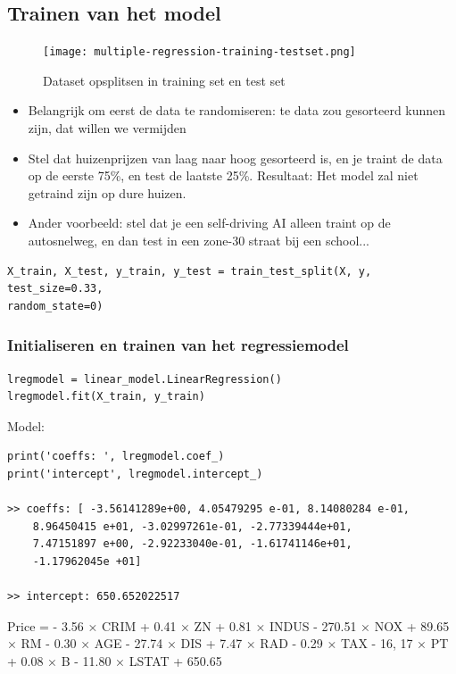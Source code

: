 \documentclass{article}
\begin{document}
\subsection{Trainen van het model}

\begin{figure}[H]
    \centering
    \texttt{[image: multiple-regression-training-testset.png]}
    \caption{Dataset opsplitsen in training set en test set}
\end{figure}

\begin{itemize}
    \item Belangrijk om eerst de data te randomiseren: te data zou gesorteerd kunnen zijn, dat willen we vermijden
    \item Stel dat huizenprijzen van laag naar hoog gesorteerd is, en je traint de data op de eerste 75\%, en test de laatste 25\%.
    Resultaat: Het model zal niet getraind zijn op dure huizen.
    \item Ander voorbeeld: stel dat je een self-driving AI alleen traint op de autosnelweg, en dan test in een zone-30 straat bij een school...
\end{itemize}


\begin{verbatim}
X_train, X_test, y_train, y_test = train_test_split(X, y, test_size=0.33, 
random_state=0)
\end{verbatim}

\subsubsection{Initialiseren en trainen van het regressiemodel}

\begin{verbatim}
lregmodel = linear_model.LinearRegression()
lregmodel.fit(X_train, y_train)
\end{verbatim}

Model:

\begin{verbatim}
print('coeffs: ', lregmodel.coef_)
print('intercept', lregmodel.intercept_)

>> coeffs: [ -3.56141289e+00, 4.05479295 e-01, 8.14080284 e-01, 
    8.96450415 e+01, -3.02997261e-01, -2.77339444e+01, 
    7.47151897 e+00, -2.92233040e-01, -1.61741146e+01, 
    -1.17962045e +01]

>> intercept: 650.652022517
\end{verbatim}

Price = - 3.56 × CRIM + 0.41 × ZN + 0.81 × INDUS - 270.51 × NOX + 89.65 × RM
- 0.30 × AGE - 27.74 × DIS + 7.47 × RAD - 0.29 × TAX - 16, 17 × PT
+ 0.08 × B - 11.80 × LSTAT + 650.65
\end{document}
